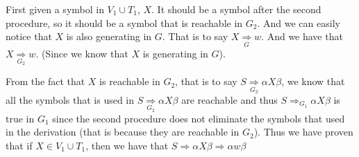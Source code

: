 \documentclass[../main.tex]{subfiles}
\begin{document}
\begin{itemize}
First given a symbol in \(V _{1} \cup T _{1}\), \(X\). It 
should be a symbol after the second procedure, so it should 
be a symbol that is reachable in \(G _{2}\). And we can 
easily notice that \(X\) is also generating in \(G\). 
		That is to say \(X \mathop{\Rightarrow}\limits_{G} w\). And we have that \(X \mathop{\Rightarrow} \limits_{G_{2}} w\). (Since we know that \(X\) is generating in \(G\)).

		From the fact that \(X\) is reachable in \(G_{2}\), that is to say \(S \mathop{\Rightarrow} \limits_{G_{2}}\alpha X\beta \), we know that all the symbols that is used in 
		\(S \mathop{\Rightarrow}\limits _{G_{2}}\alpha X\beta\) are reachable and thus \(S \Rightarrow _{G_{1}}\alpha X\beta  \) is true in \(G _{1}\)  since the second procedure 
		does not eliminate the symbols that used in the 
		derivation (that is because they are reachable in \(G_{2}\)). Thus we have proven that if \(X \in V_{1} \cup T_{1}\), then we have that \(S \Rightarrow\alpha X\beta \Rightarrow\alpha w\beta\)
\end{itemize}


\end{document}
